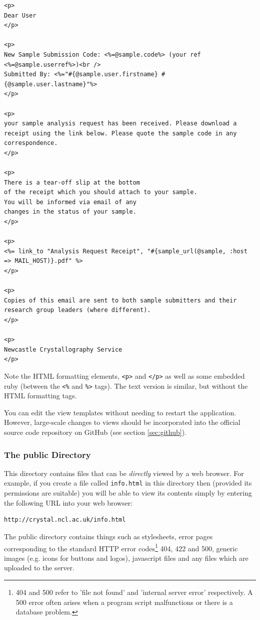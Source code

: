 \documentclass[12pt,twoside]{article}
\begin{document}
\begin{description}
\tiny
\begin{verbatim}
<p>
Dear User
</p>

<p>
New Sample Submission Code: <%=@sample.code%> (your ref <%=@sample.userref%>)<br />
Submitted By: <%="#{@sample.user.firstname} #{@sample.user.lastname}"%>
</p>

<p>
your sample analysis request has been received. Please download a
receipt using the link below. Please quote the sample code in any
correspondence. 
</p>

<p>
There is a tear-off slip at the bottom
of the receipt which you should attach to your sample.
You will be informed via email of any
changes in the status of your sample.
</p>

<p>
<%= link_to "Analysis Request Receipt", "#{sample_url(@sample, :host => MAIL_HOST)}.pdf" %>
</p>

<p>
Copies of this email are sent to both sample submitters and their
research group leaders (where different).
</p>

<p>
Newcastle Crystallography Service
</p>
\end{verbatim}
\normalsize

Note the HTML formatting elements, \verb=<p>= and \verb=</p>= as well
as some embedded ruby (between the \verb=<%= and \verb=%>= tags).
The text version is similar, but without the HTML formatting tags.

\begin{plainblock}
You can edit the view templates without needing to restart
the application. However, large-scale changes to views should be
incorporated into the official source code repository on GitHub
(see section \ref{sec:github}).
\end{plainblock}

\end{description}
\subsubsection{The public Directory}
This directory contains files that can be \emph{directly} viewed by
a web browser. For example, if you create a file called \verb=info.html=
in this directory then (provided its permissions are suitable) you will be
able to view its contents simply by entering the following URL into your
web browser:
\begin{verbatim}
http://crystal.ncl.ac.uk/info.html
\end{verbatim}
The public directory contains things such as stylesheets, error pages
corresponding to the standard HTTP error codes\footnote{404 and 500 refer
to 'file not found' and 'internal server error' respectively. A 500 error
often arises when a program script malfunctions or there is a 
database problem.} 404, 422 and 500, generic
images (e.g. icons for buttons and logos), javascript files and any files
which are uploaded to the server. 
\end{document}
